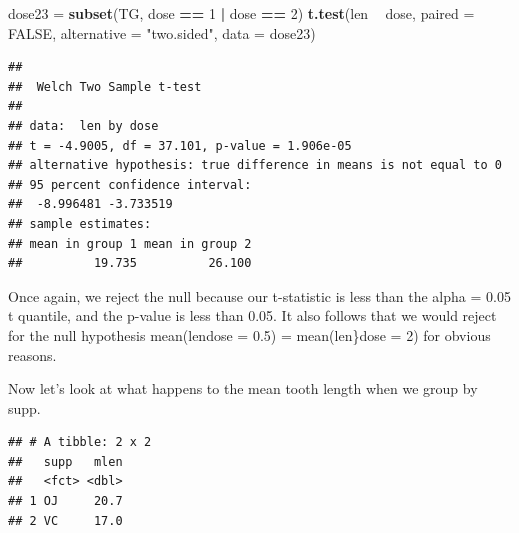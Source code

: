 \documentclass[
]{article}
\newenvironment{Shaded}{\begin{snugshade}}{\end{snugshade}}
\newcommand{\DataTypeTok}[1]{\textcolor[rgb]{0.13,0.29,0.53}{#1}}
\newcommand{\DecValTok}[1]{\textcolor[rgb]{0.00,0.00,0.81}{#1}}
\newcommand{\KeywordTok}[1]{\textcolor[rgb]{0.13,0.29,0.53}{\textbf{#1}}}
\newcommand{\NormalTok}[1]{#1}
\newcommand{\OperatorTok}[1]{\textcolor[rgb]{0.81,0.36,0.00}{\textbf{#1}}}
\newcommand{\OtherTok}[1]{\textcolor[rgb]{0.56,0.35,0.01}{#1}}
\newcommand{\StringTok}[1]{\textcolor[rgb]{0.31,0.60,0.02}{#1}}
\begin{document}
\begin{Shaded}
\begin{Highlighting}[]
\NormalTok{dose23 =}\StringTok{ }\KeywordTok{subset}\NormalTok{(TG, dose }\OperatorTok{==}\StringTok{ }\DecValTok{1} \OperatorTok{|}\StringTok{ }\NormalTok{dose }\OperatorTok{==}\StringTok{ }\DecValTok{2}\NormalTok{)}
\KeywordTok{t.test}\NormalTok{(len }\OperatorTok{~}\StringTok{ }\NormalTok{dose, }\DataTypeTok{paired =} \OtherTok{FALSE}\NormalTok{, }\DataTypeTok{alternative =} \StringTok{"two.sided"}\NormalTok{, }\DataTypeTok{data =}\NormalTok{ dose23)}
\end{Highlighting}
\end{Shaded}

\begin{verbatim}
## 
##  Welch Two Sample t-test
## 
## data:  len by dose
## t = -4.9005, df = 37.101, p-value = 1.906e-05
## alternative hypothesis: true difference in means is not equal to 0
## 95 percent confidence interval:
##  -8.996481 -3.733519
## sample estimates:
## mean in group 1 mean in group 2 
##          19.735          26.100
\end{verbatim}

Once again, we reject the null because our t-statistic is less than the
alpha = 0.05 t quantile, and the p-value is less than 0.05. It also
follows that we would reject for the null hypothesis
mean(len\textbar dose = 0.5) = mean(len\}dose = 2) for obvious reasons.

Now let's look at what happens to the mean tooth length when we group by
supp.

\begin{Shaded}
\end{Shaded}

\begin{verbatim}
## # A tibble: 2 x 2
##   supp   mlen
##   <fct> <dbl>
## 1 OJ     20.7
## 2 VC     17.0
\end{verbatim}
\end{document}
